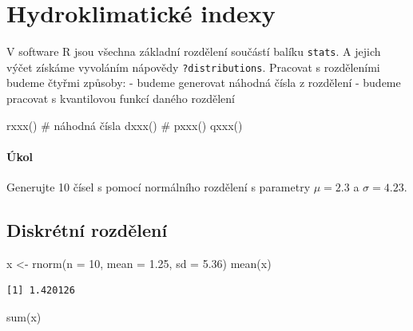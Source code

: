 \documentclass[
  letterpaper,
  DIV=11,
  numbers=noendperiod]{scrreprt}
\newenvironment{Shaded}{\begin{snugshade}}{\end{snugshade}}
\newcommand{\AttributeTok}[1]{\textcolor[rgb]{0.40,0.45,0.13}{#1}}
\newcommand{\CommentTok}[1]{\textcolor[rgb]{0.37,0.37,0.37}{#1}}
\newcommand{\DecValTok}[1]{\textcolor[rgb]{0.68,0.00,0.00}{#1}}
\newcommand{\FloatTok}[1]{\textcolor[rgb]{0.68,0.00,0.00}{#1}}
\newcommand{\FunctionTok}[1]{\textcolor[rgb]{0.28,0.35,0.67}{#1}}
\newcommand{\NormalTok}[1]{\textcolor[rgb]{0.00,0.23,0.31}{#1}}
\newcommand{\OtherTok}[1]{\textcolor[rgb]{0.00,0.23,0.31}{#1}}
\begin{document}

\hypertarget{hydroklimatickuxe9-indexy}{%
\chapter{Hydroklimatické indexy}\label{hydroklimatickuxe9-indexy}}

V software R jsou všechna základní rozdělení součástí balíku
\texttt{stats}. A jejich výčet získáme vyvoláním nápovědy
\texttt{?distributions}. Pracovat s rozděleními budeme čtyřmi způsoby: -
budeme generovat náhodná čísla z rozdělení - budeme pracovat s
kvantilovou funkcí daného rozdělení

\begin{Shaded}
\begin{Highlighting}[]
\FunctionTok{rxxx}\NormalTok{() }\CommentTok{\# náhodná čísla}
\FunctionTok{dxxx}\NormalTok{() }\CommentTok{\# }
\FunctionTok{pxxx}\NormalTok{()}
\FunctionTok{qxxx}\NormalTok{()}
\end{Highlighting}
\end{Shaded}

\hypertarget{uxfakol}{%
\subsubsection{Úkol}\label{uxfakol}}

Generujte 10 čísel s pomocí normálního rozdělení s parametry
\(\mu = 2.3\) a \(\sigma = 4.23\).

\hypertarget{diskruxe9tnuxed-rozdux11blenuxed-1}{%
\section{Diskrétní rozdělení}\label{diskruxe9tnuxed-rozdux11blenuxed-1}}

\begin{Shaded}
\begin{Highlighting}[]
\NormalTok{x }\OtherTok{\textless{}{-}} \FunctionTok{rnorm}\NormalTok{(}\AttributeTok{n =} \DecValTok{10}\NormalTok{, }\AttributeTok{mean =} \FloatTok{1.25}\NormalTok{, }\AttributeTok{sd =} \FloatTok{5.36}\NormalTok{)}
\FunctionTok{mean}\NormalTok{(x)}
\end{Highlighting}
\end{Shaded}

\begin{verbatim}
[1] 1.420126
\end{verbatim}

\begin{Shaded}
\begin{Highlighting}[]
\FunctionTok{sum}\NormalTok{(x)}
\end{Highlighting}
\end{Shaded}
\end{document}
